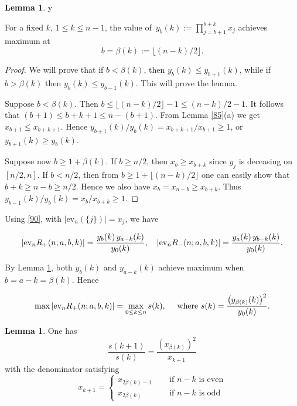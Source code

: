\documentclass{amsart}
\theoremstyle{definition}
\newtheorem{lemma}[theorem]{Lemma}
\def\printname#1{
    \if\draft y
        \smash{\makebox[0pt]{\hspace{-0.5in}
            \raisebox{8pt}{\tt\tiny #1}}}
    \fi
}
\def\lbl#1{\label{#1}\printname{#1}}
\def\ev{\mathrm{ev}}
\begin{document}
\begin{lemma}
\lbl{45}
For a fixed $k$, $1\le k\le n-1$, the value of\,  $y_b(k):=
\prod_{j=b+1}^{b+k} x_j$ achieves maximum at 
\begin{equation}
b = \beta(k):=\lfloor (n-k)/2
\rfloor.
\end{equation}
\end{lemma}



\begin{proof} %
We will  prove that if $b < \beta(k)$, then $y_b(k) \le y_{b+1}(k)$, while if $b> \beta(k)$ then $y_b(k) \le y_{b-1}(k)$. This will prove the lemma.

Suppose  $b < \beta(k)$. Then  $b \le  \lfloor
(n-k)/2 \rfloor -1 \le (n-k)/2 -1$. It follows that $(b+1) \le b+k+1
\le n-(b+1).$ From Lemma \ref{85}(a) we get $x_{b+1} \le x_{b+k+1}$.
Hence $y_{b+1}(k)/y_b(k) = x_{b+k+1}/x_{b+1} \ge 1$, or $y_{b+1}(k) \ge y_b(k)$.

Suppose now $b \ge 1+ \beta(k)$. If $b \ge n/2$, then
$x_b \ge x_{b+k}$ since $y_j$ is deceasing on $[n/2,n]$. If $ b
<n/2$, then from $b \ge 1+ \lfloor (n-k)/2 \rfloor$ one can easily
show that $b+k \ge n-b \ge n/2$. Hence we also have $x_{b}=
x_{n-b}\ge x_{b+k}$. Thus $y_{b-1}(k)/y_b(k) = x_b /x_{b+k} \ge 1$.
\end{proof}

 Using \eqref{90}, with
$|\ev_n(\{j\})|=x_j$, we have


\begin{equation}
\lbl{84}
|\ev_n R_+(n;a,b,k)| =   \frac{y_b(k) \, y_{a-k}(k) }{y_0(k)
}, \quad |\ev_n R_-(n;a,b,k)| =   \frac{y_a(k) \, y_{b-k}(k) }{y_0(k)
}.
\end{equation}

By Lemma \ref{45}, both
$y_b(k)$ and $y_{a-k}(k)$ achieve maximum when $b=a-k=\beta(k)$. Hence 



\begin{equation}
 \max |\ev_n R_+(n;a,b,k)| = \max_{0\le k \le n} s(k) ,
\quad \text{ where } s(k)= \frac{\left(y_{\beta(k)}(k)\right) ^2}{y_0(k)}.
 \lbl{e103}
 \end{equation}


\begin{lemma}
\label{l108}
One has
\begin{equation} \frac{s(k+1)}{s(k)} = \frac{(x_{\beta(k)})^2}{x_{k+1}}
\label{e108}
 \end{equation}
with the denominator satisfying
\begin{equation}
 x_{k+1} = \begin{cases}
            x_{2\beta(k)-1} \quad &\text{ if  $n-k$ is even}\\
 x_{2\beta(k)} \quad & \text{ if  $n-k$ is odd}
           \end{cases}
           \label{e116}
\end{equation}
\end{lemma}
\end{document}
